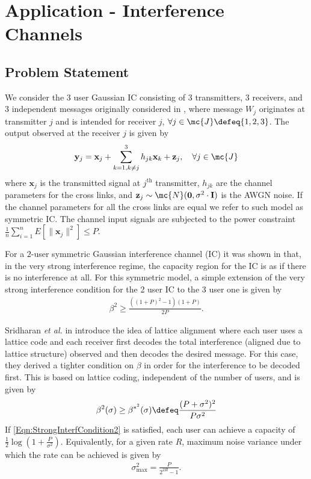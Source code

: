 \documentclass[journal]{IEEEtran}
\begin{document}
\section{Application - Interference Channels}
\subsection{Problem Statement}
We consider the 3 user Gaussian IC consisting of 3 transmitters, 3 receivers, and 3 independent messages originally considered in \cite{sridharan2008capacity}, where message $W_{j}$ originates at transmitter $j$ and is intended for receiver $j$, $\forall j\in \mc{J}\defeq\{1,2,3\}$. The output observed at the receiver $j$ is given by
\begin{align}\label{SymmInterfChannel}
    \mathbf{y}_{j}=\mathbf{x}_{j}+ \sum^{3}_{k=1,k\neq j}h_{jk}\mathbf{x}_{k}+\mathbf{z}_{j}, \hspace{10pt} \forall j\in \mc{J}
\end{align}
where $\mathbf{x}_{j}$ is the transmitted signal at $j^{\text{th}}$ transmitter, $h_{jk}$ are the channel parameters for the cross links, and $\mathbf{z}_{j}\sim\mc{N}(\mathbf{0},\sigma^{2}\cdot \mathbf{I})$ is the AWGN noise. If the channel parameters for all the cross links are equal we refer to such model as symmetric IC. The channel input signals are subjected to the power constraint
$\frac{1}{n}\sum_{i=1}^{n}E\left[\|\mathbf{x}_{j}\|^2\right]\leq P$.

For a $2$-user symmetric Gaussian interference channel (IC) it was shown in \cite{carleial1978interference} that, in the very strong interference regime, the capacity region for the IC is as if there is no interference at all. For this symmetric model, a simple extension of the very strong interference condition for the 2 user IC %
to the 3 user one is given by \cite{sridharan2008capacity}
\begin{align}
\beta^{2}\geq \frac{\left((1+P)^{2}-1\right)\left(1+P\right)}{2P}.
\label{Eqn:StrongInterfCondition1}
\end{align}

Sridharan \textit{et al.} in \cite{sridharan2008capacity} introduce the idea of lattice alignment where each user uses a lattice code and each receiver first decodes the total interference (aligned due to lattice structure) observed and then decodes the desired message. For this case, they
derived a tighter condition on $\beta$ in order for the interference to be decoded first. This is based on lattice coding, independent of the number of users, and is given by
\begin{align}
\beta^{2}(\sigma)\geq \beta^{*^{2}}(\sigma)\defeq\frac{(P+\sigma^{2})^{2}}{P\sigma^{2}}
\label{Eqn:StrongInterfCondition2}
\end{align}
If \eqref{Eqn:StrongInterfCondition2} is satisfied, each user can achieve a capacity \cite{sridharan2008capacity} of
$\frac{1}{2}\log(1+\frac{P}{\sigma^{2}})$. Equivalently, for a given rate $R$, maximum noise variance under which the rate can be achieved is given by
\begin{align}
\sigma^{2}_{\text{max}}=\frac{P}{2^{2R}-1}.
\label{Eqn:SigmaShannon}
\end{align}
\end{document}
